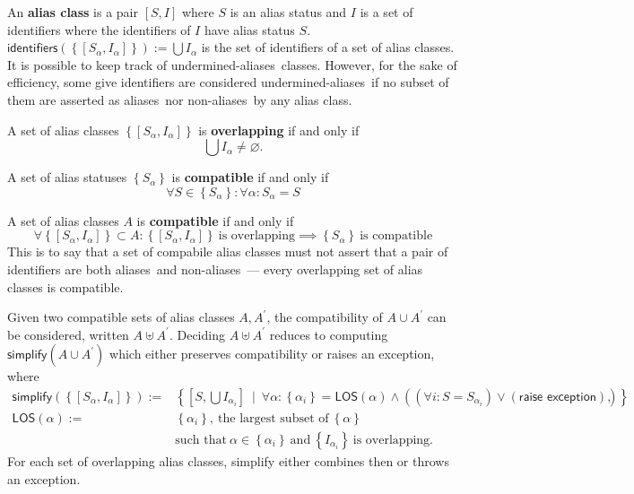 \documentclass{article}
\newcommand{\tsf}{\textsf}
\newcommand{\tbf}{\textbf}
\newcommand{\set}[1]{\left\{ #1 \right\}}
\newcommand{\p}{^\prime}
\renewcommand{\empty}{\varnothing}
\newcommand{\aliases}{\tsf{aliases}}
\newcommand{\nonaliases}{\tsf{non-aliases}}
\newcommand{\unaliases}{\tsf{undermined-aliases}}
\newcommand{\compatible}{\uplus}
\begin{document}
\noindent
An \tbf{alias class} is a pair $[S,I]$ where $S$ is an alias status and $I$ is a set of identifiers where the identifiers of $I$ have alias status $S$.
$\tsf{identifiers}(\set{[S_\alpha, I_\alpha]}) := \bigcup I_\alpha$ is the set of identifiers of a set of alias classes.
It is possible to keep track of \unaliases\ classes. However, for the sake of efficiency, some give identifiers are considered \unaliases\ if no subset of them are asserted as \aliases\ nor \nonaliases\ by any alias class.

\noindent
A set of alias classes $\set{ [S_\alpha, I_\alpha] }$ is \tbf{overlapping} if and only if
$$ \bigcup I_\alpha \neq \empty. $$

\noindent
A set of alias statuses $\set{ S_\alpha }$ is \tbf{compatible} if and only if
$$ \forall S \in \set{S_\alpha} : \forall \alpha : S_\alpha = S $$

\noindent
A set of alias classes $A$ is \tbf{compatible} if and only if
$$
\forall \set{ [S_\alpha, I_\alpha] } \subset A :
\set{ [S_\alpha, I_\alpha] } \ \text{is overlapping}
\implies
\set{ S_\alpha } \ \text{is compatible}
$$
This is to say that a set of compabile alias classes must not assert that a pair of identifiers are both \aliases\ and \nonaliases\ --- every overlapping set of alias classes is compatible.

\noindent
Given two compatible sets of alias classes $A, A\p$, the compatibility of $A \cup A\p$ can be considered, written $A \compatible A\p$. Deciding $A \compatible A\p$ reduces to computing $\tsf{simplify}(A \cup A\p)$ which either preserves compatibility or raises an exception, where
\begin{align*}
\tsf{simplify}(\set{ [S_\alpha, I_\alpha] })
:= &
\set{
  \left[ S, \bigcup I_{\alpha_i} \right]
  \ \mid \
  \forall \alpha :
  \set{ \alpha_i } = \tsf{LOS}(\alpha)
  \land
  ((\forall i : S = S_{\alpha_i}) \lor (\tsf{raise exception}))
},
\\
\tsf{LOS}(\alpha)
:= &
\set{ \alpha_i }, \
\text{the largest subset of} \ \set{ \alpha } \\&
\text{such that} \ \alpha \in \set{ \alpha_i } \
\text{and} \ \set{ I_{\alpha_i} } \ \text{is overlapping}.
\end{align*}
For each set of overlapping alias classes, \tsf{simplify} either combines then or throws an exception.

\newpage
\end{document}
